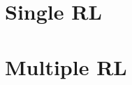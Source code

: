 \documentclass[a4paper,10pt]{article}
\title{}
\author{}
\begin{document}
\maketitle

\section{Single RL}
  

\section{Multiple RL}
\end{document}
